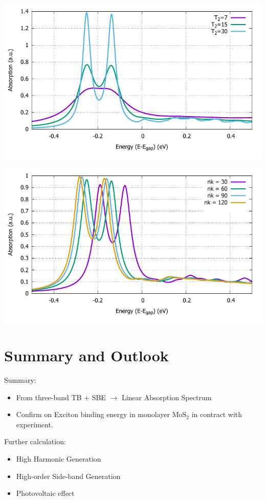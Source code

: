\documentclass{beamer}
\begin{document}
	\begin{frame}
	\includegraphics[width=1\linewidth]{images/varyT2.pdf}
	\end{frame}
	\begin{frame}
	\includegraphics[width=1\linewidth]{images/varynk.pdf}
	\end{frame}
	\section{Summary and Outlook}
	\begin{frame}
		Summary:
		\begin{itemize}
	\item From three-band TB + SBE $\to $ Linear Absorption Spectrum
	\item Confirm on Exciton binding energy in monolayer $\mathrm{MoS}_2$ in contract with experiment.
		\end{itemize}
	Further calculation:
	\begin{itemize}
		\item High Harmonic Generation
		\item High-order Side-band Generation
		\item Photovoltaic effect
	\end{itemize}
	\end{frame}
	\begin{frame}
		
		
		
	\end{frame}
\end{document}
